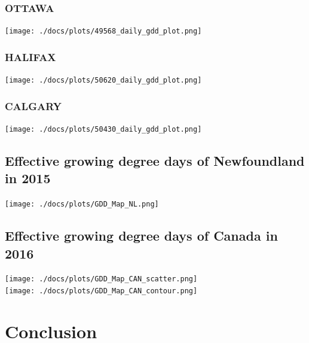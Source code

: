 \documentclass{article}
\begin{document}
\subsubsection{OTTAWA}

\texttt{[image: ./docs/plots/49568\_daily\_gdd\_plot.png]}\\

\subsubsection{HALIFAX}

\texttt{[image: ./docs/plots/50620\_daily\_gdd\_plot.png]}\\

\subsubsection{CALGARY}

\texttt{[image: ./docs/plots/50430\_daily\_gdd\_plot.png]}\\


\subsection{Effective growing degree days of Newfoundland in 2015}

\texttt{[image: ./docs/plots/GDD\_Map\_NL.png]}\\

\subsection{Effective growing degree days of Canada in 2016}

\texttt{[image: ./docs/plots/GDD\_Map\_CAN\_scatter.png]}\\

\texttt{[image: ./docs/plots/GDD\_Map\_CAN\_contour.png]}\\


\section{Conclusion}
\end{document}
